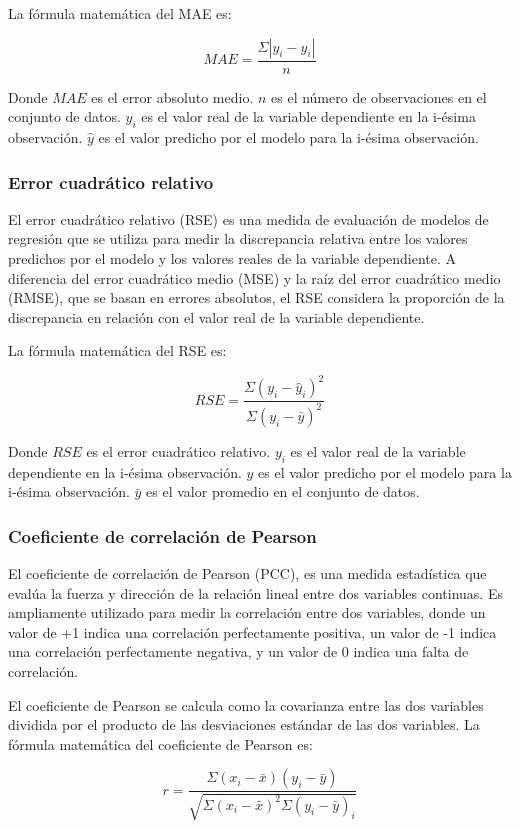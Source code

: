 La fórmula matemática del MAE es:

$$MAE = \frac{\Sigma |y_i - \hat{y}_i|}{n}$$

Donde $MAE$ es el error absoluto medio. $n$ es el número de observaciones en el conjunto de datos. $y_i$ es el valor real de la variable dependiente en la i-ésima observación. $\hat{y}$ es el valor predicho por el modelo para la i-ésima observación.


\subsubsection{Error cuadrático relativo}
El error cuadrático relativo (RSE) es una medida de evaluación de modelos de regresión que se utiliza para medir la discrepancia relativa entre los valores predichos por el modelo y los valores reales de la variable dependiente. A diferencia del error cuadrático medio (MSE) y la raíz del error cuadrático medio (RMSE), que se basan en errores absolutos, el RSE considera la proporción de la discrepancia en relación con el valor real de la variable dependiente.

La fórmula matemática del RSE es:

$$RSE = \frac{\Sigma(y_i - \hat{y}_i)^2}{\Sigma(y_i - \bar{y})^2}$$

Donde $RSE$ es el error cuadrático relativo. $y_i$ es el valor real de la variable dependiente en la i-ésima observación. $\hat{y}$ es el valor predicho por el modelo para la i-ésima observación. $\bar{y}$ es el valor promedio en el conjunto de datos.


\subsubsection{Coeficiente de correlación de Pearson}
El coeficiente de correlación de Pearson (PCC), es una medida estadística que evalúa la fuerza y dirección de la relación lineal entre dos variables continuas. Es ampliamente utilizado para medir la correlación entre dos variables, donde un valor de +1 indica una correlación perfectamente positiva, un valor de -1 indica una correlación perfectamente negativa, y un valor de 0 indica una falta de correlación.

El coeficiente de Pearson se calcula como la covarianza entre las dos variables dividida por el producto de las desviaciones estándar de las dos variables. La fórmula matemática del coeficiente de Pearson es:

$$r = \frac{\Sigma(x_i - \bar{x})(y_i - \bar{y})}{\sqrt{\Sigma(x_i - \bar{x})^2\Sigma(y_i - \bar{y})_i}}$$

